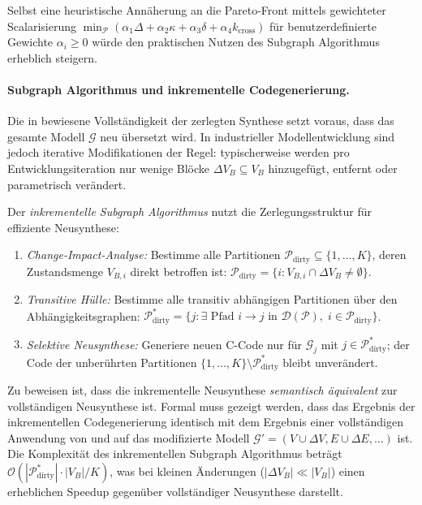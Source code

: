 ﻿\documentclass[12pt,a4paper]{article}
\theoremstyle{definition}
\begin{document}
Selbst eine heuristische Annäherung an die Pareto-Front mittels
gewichteter Scalarisierung
$\min_{\mathcal{P}} (\alpha_1 \Delta + \alpha_2 \kappa + \alpha_3 \delta + \alpha_4 k_{\mathrm{cross}})$
für benutzerdefinierte Gewichte $\alpha_i \geq 0$ würde den
praktischen Nutzen des Subgraph Algorithmus erheblich steigern.

\paragraph{Subgraph Algorithmus und inkrementelle Codegenerierung.}
Die in  bewiesene Vollständigkeit der
zerlegten Synthese setzt voraus, dass das gesamte Modell $\mathcal{G}$
neu übersetzt wird. In industrieller Modellentwicklung sind jedoch
iterative Modifikationen der Regel: typischerweise werden pro
Entwicklungsiteration nur wenige Blöcke $\Delta V_B \subseteq V_B$
hinzugefügt, entfernt oder parametrisch verändert.

Der \emph{inkrementelle Subgraph Algorithmus} nutzt die Zerlegungsstruktur
für effiziente Neusynthese:

\begin{enumerate}[label=(\roman*), nosep]
  \item \emph{Change-Impact-Analyse:} Bestimme alle Partitionen
        $\mathcal{P}_{\mathrm{dirty}} \subseteq \{1,\ldots,K\}$, deren
        Zustandsmenge $V_{B,i}$ direkt betroffen ist:
        $\mathcal{P}_{\mathrm{dirty}} = \{i : V_{B,i} \cap \Delta V_B \neq \emptyset\}$.

  \item \emph{Transitive Hülle:} Bestimme alle transitiv abhängigen
        Partitionen über den Abhängigkeitsgraphen:
        $\mathcal{P}_{\mathrm{dirty}}^* = \{j : \exists \text{ Pfad } i \to j
        \text{ in } \mathcal{D}(\mathcal{P}),\; i \in \mathcal{P}_{\mathrm{dirty}}\}$.

  \item \emph{Selektive Neusynthese:} Generiere neuen C-Code nur für
        $\mathcal{G}_j$ mit $j \in \mathcal{P}_{\mathrm{dirty}}^*$;
        der Code der unberührten Partitionen $\{1,\ldots,K\} \setminus
        \mathcal{P}_{\mathrm{dirty}}^*$ bleibt unverändert.
\end{enumerate}

Zu beweisen ist, dass die inkrementelle Neusynthese
\emph{semantisch äquivalent} zur vollständigen Neusynthese ist.
Formal muss gezeigt werden, dass das Ergebnis der inkrementellen
Codegenerierung identisch mit dem Ergebnis einer vollständigen
Anwendung von  und 
auf das modifizierte Modell $\mathcal{G}' = (V \cup \Delta V, E \cup
\Delta E, \ldots)$ ist. Die Komplexität des inkrementellen Subgraph
Algorithmus beträgt $\mathcal{O}(|\mathcal{P}_{\mathrm{dirty}}^*| \cdot |V_B|/K)$,
was bei kleinen Änderungen ($|\Delta V_B| \ll |V_B|$) einen erheblichen
Speedup gegenüber vollständiger Neusynthese darstellt.
\end{document}
